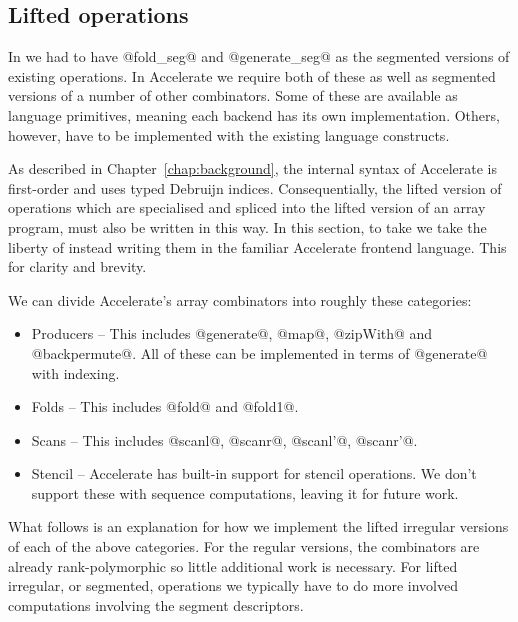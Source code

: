 \subsection{Lifted operations}

In \ndp{} we had to have @fold_seg@ and @generate_seg@ as the segmented versions of existing operations. In Accelerate we require both of these as well as segmented versions of a number of other combinators. Some of these are available as language primitives, meaning each backend has its own implementation. Others, however, have to be implemented with the existing language constructs.

As described in Chapter~\ref{chap:background}, the internal syntax of Accelerate is first-order and uses typed Debruijn indices. Consequentially, the lifted version of operations which are specialised and spliced into the lifted version of an array program, must also be written in this way. In this section, to take we take the liberty of instead writing them in the familiar Accelerate frontend language. This for clarity and brevity.

We can divide Accelerate's array combinators into roughly these categories:
%
\begin{itemize}
\item  Producers -- This includes @generate@, @map@, @zipWith@ and @backpermute@. All of these can be implemented in terms of @generate@ with indexing.
\item Folds -- This includes @fold@ and @fold1@.
\item Scans -- This includes @scanl@, @scanr@, @scanl'@, @scanr'@.
\item Stencil -- Accelerate has built-in support for stencil operations. We don't support these with sequence computations, leaving it for future work.
\end{itemize}

What follows is an explanation for how we implement the lifted irregular versions of each of the above categories. For the regular versions, the combinators are already rank-polymorphic so little additional work is necessary. For lifted irregular, or segmented, operations we typically have to do more involved computations involving the segment descriptors.

